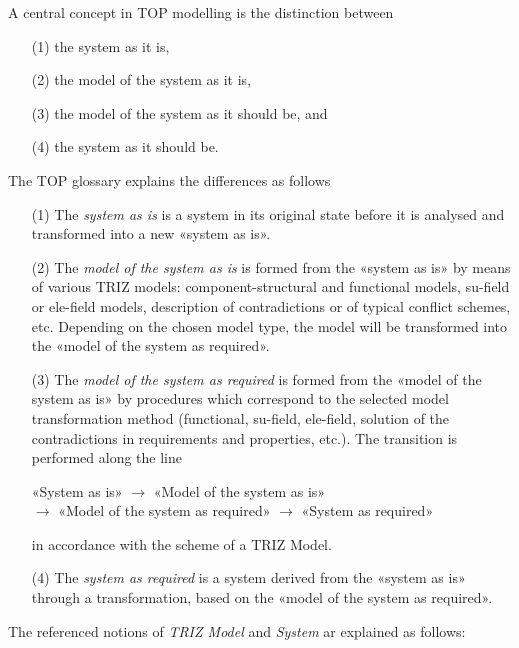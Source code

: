\documentclass[11pt,a4paper]{article}
\begin{document}
A central concept in TOP modelling is the distinction between
\begin{itemize}[noitemsep]
\item [(1)] the system as it is,
\item [(2)] the model of the system as it is,
\item [(3)] the model of the system as it should be, and 
\item [(4)] the system as it should be. 
\end{itemize}
The TOP glossary \cite{TOP-Glossary} explains the differences as follows
\begin{itemize}[noitemsep]
\item [(1)] The \emph{system as is} is a system in its original state before
  it is analysed and transformed into a new «system as is».
\item [(2)] The \emph{model of the system as is} is formed from the «system as
  is» by means of various TRIZ models: component-structural and functional
  models, su-field or ele-field models, description of contradictions or of
  typical conflict schemes, etc. Depending on the chosen model type, the model
  will be transformed into the «model of the system as required».
\item [(3)] The \emph{model of the system as required} is formed from the
  «model of the system as is» by procedures which correspond to the selected
  model transformation method (functional, su-field, ele-field, solution of
  the contradictions in requirements and properties, etc.). The transition is
  performed along the line
  \begin{center}
    «System as is» $\to$ «Model of the system as is»\\ $\to$ «Model of the
    system as required» $\to$ «System as required»
  \end{center}
  in accordance with the scheme of a TRIZ Model.
\item [(4)] The \emph{system as required} is a system derived from the «system
  as is» through a transformation, based on the «model of the system as
  required».
 \end{itemize}
The referenced notions of \emph{TRIZ Model} and \emph{System} ar explained as
follows:
\end{document}
